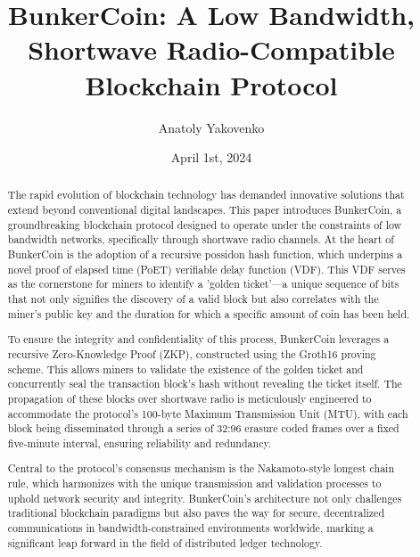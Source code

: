 \documentclass{article}
\title{BunkerCoin: A Low Bandwidth, Shortwave Radio-Compatible Blockchain Protocol}
\author{Anatoly Yakovenko}
\date{April 1st, 2024}
\begin{document}
\maketitle

\begin{abstract}
The rapid evolution of blockchain technology has demanded innovative solutions that extend beyond conventional digital landscapes. This paper introduces BunkerCoin, a groundbreaking blockchain protocol designed to operate under the constraints of low bandwidth networks, specifically through shortwave radio channels. At the heart of BunkerCoin is the adoption of a recursive possidon hash function, which underpins a novel proof of elapsed time (PoET) verifiable delay function (VDF). This VDF serves as the cornerstone for miners to identify a 'golden ticket'—a unique sequence of bits that not only signifies the discovery of a valid block but also correlates with the miner's public key and the duration for which a specific amount of coin has been held.

To ensure the integrity and confidentiality of this process, BunkerCoin leverages a recursive Zero-Knowledge Proof (ZKP), constructed using the Groth16 proving scheme. This allows miners to validate the existence of the golden ticket and concurrently seal the transaction block's hash without revealing the ticket itself. The propagation of these blocks over shortwave radio is meticulously engineered to accommodate the protocol's 100-byte Maximum Transmission Unit (MTU), with each block being disseminated through a series of 32:96 erasure coded frames over a fixed five-minute interval, ensuring reliability and redundancy.

Central to the protocol's consensus mechanism is the Nakamoto-style longest chain rule, which harmonizes with the unique transmission and validation processes to uphold network security and integrity. BunkerCoin's architecture not only challenges traditional blockchain paradigms but also paves the way for secure, decentralized communications in bandwidth-constrained environments worldwide, marking a significant leap forward in the field of distributed ledger technology.
\end{abstract}
\end{document}
